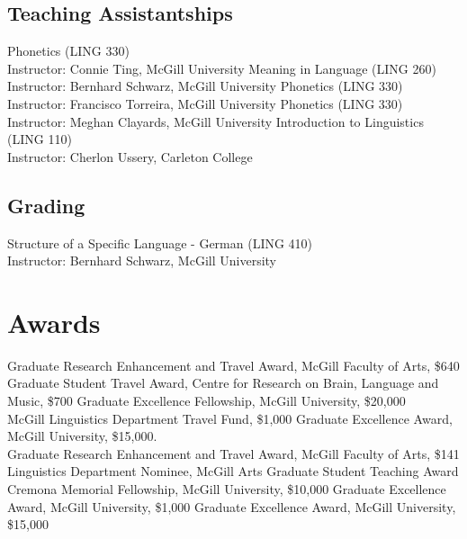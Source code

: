 \documentclass[11pt,oneside,letterpaper]{johnstoncv}
\begin{document}
\begin{entries}
\subsection{Teaching Assistantships}
\Item[2021] Phonetics (LING 330)\\ Instructor: Connie Ting, McGill University
\Item[2020] Meaning in Language (LING 260)\\ Instructor: Bernhard Schwarz, McGill University
\Item[2020] Phonetics (LING 330)\\ Instructor: Francisco Torreira, McGill University
\Item[2019] Phonetics (LING 330)\\ Instructor: Meghan Clayards, McGill University
\Item[2012] Introduction to Linguistics (LING 110)\\ Instructor: Cherlon Ussery, Carleton College

\subsection{Grading}
\Item[2020]	Structure of a Specific Language - German (LING 410)\\ Instructor: Bernhard Schwarz, McGill University

\section{Awards}

\Item[2023--2024] Graduate Research Enhancement and Travel Award, McGill Faculty of Arts, \$640 \\ Graduate Student Travel Award, Centre for Research on Brain, Language and Music, \$700
\Item[2022--2023] Graduate Excellence Fellowship, McGill University, \$20,000 \\ McGill Linguistics Department Travel Fund, \$1,000
\Item[2021--2022] Graduate Excellence Award, McGill University, \$15,000. \\ Graduate Research Enhancement and Travel Award, McGill Faculty of Arts, \$141
\Item[2020--2021] Linguistics Department Nominee, McGill Arts Graduate Student Teaching Award \\ Cremona Memorial Fellowship, McGill University, \$10,000
\Item[2019--2020] Graduate Excellence Award, McGill University, \$1,000
\Item[2018--2019] Graduate Excellence Award, McGill University, \$15,000


\end{entries}
\end{document}
